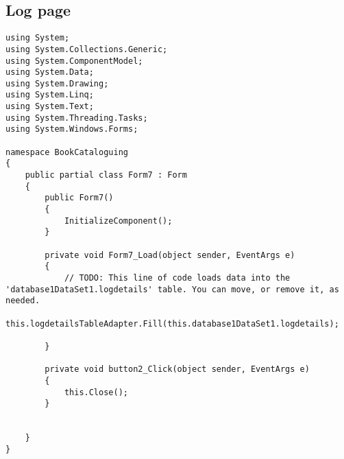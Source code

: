 \subsection{Log page}
\begin{lstlisting}
using System;
using System.Collections.Generic;
using System.ComponentModel;
using System.Data;
using System.Drawing;
using System.Linq;
using System.Text;
using System.Threading.Tasks;
using System.Windows.Forms;

namespace BookCataloguing
{
    public partial class Form7 : Form
    {
        public Form7()
        {
            InitializeComponent();
        }

        private void Form7_Load(object sender, EventArgs e)
        {
            // TODO: This line of code loads data into the 'database1DataSet1.logdetails' table. You can move, or remove it, as needed.
            this.logdetailsTableAdapter.Fill(this.database1DataSet1.logdetails);

        }

        private void button2_Click(object sender, EventArgs e)
        {
            this.Close();
        }

      
    }
}
\end{lstlisting}
